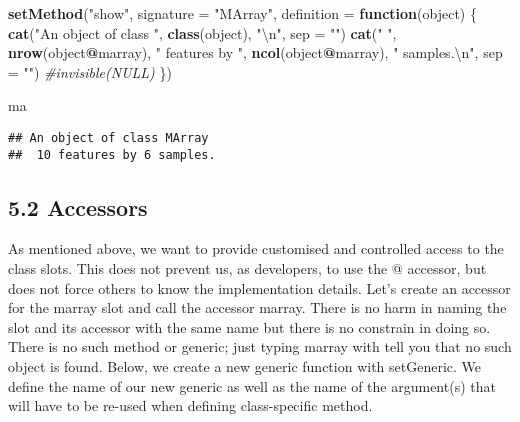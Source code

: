 \documentclass[]{article}
\newenvironment{Shaded}{\begin{snugshade}}{\end{snugshade}}
\newcommand{\CharTok}[1]{\textcolor[rgb]{0.31,0.60,0.02}{#1}}
\newcommand{\CommentTok}[1]{\textcolor[rgb]{0.56,0.35,0.01}{\textit{#1}}}
\newcommand{\ControlFlowTok}[1]{\textcolor[rgb]{0.13,0.29,0.53}{\textbf{#1}}}
\newcommand{\DataTypeTok}[1]{\textcolor[rgb]{0.13,0.29,0.53}{#1}}
\newcommand{\KeywordTok}[1]{\textcolor[rgb]{0.13,0.29,0.53}{\textbf{#1}}}
\newcommand{\NormalTok}[1]{#1}
\newcommand{\OperatorTok}[1]{\textcolor[rgb]{0.81,0.36,0.00}{\textbf{#1}}}
\newcommand{\StringTok}[1]{\textcolor[rgb]{0.31,0.60,0.02}{#1}}
\begin{document}
\begin{Shaded}
\begin{Highlighting}[]
\KeywordTok{setMethod}\NormalTok{(}\StringTok{"show"}\NormalTok{, }
          \DataTypeTok{signature =} \StringTok{"MArray"}\NormalTok{, }
          \DataTypeTok{definition =} \ControlFlowTok{function}\NormalTok{(object) \{}
            \KeywordTok{cat}\NormalTok{(}\StringTok{"An object of class "}\NormalTok{, }\KeywordTok{class}\NormalTok{(object), }\StringTok{"}\CharTok{\textbackslash{}n}\StringTok{"}\NormalTok{, }\DataTypeTok{sep =} \StringTok{""}\NormalTok{)}
            \KeywordTok{cat}\NormalTok{(}\StringTok{" "}\NormalTok{, }\KeywordTok{nrow}\NormalTok{(object}\OperatorTok{@}\NormalTok{marray), }\StringTok{" features by "}\NormalTok{, }\KeywordTok{ncol}\NormalTok{(object}\OperatorTok{@}\NormalTok{marray), }
                \StringTok{" samples.}\CharTok{\textbackslash{}n}\StringTok{"}\NormalTok{, }\DataTypeTok{sep =} \StringTok{""}\NormalTok{)}
            \CommentTok{#invisible(NULL) }
\NormalTok{            \})}
\end{Highlighting}
\end{Shaded}

\begin{Shaded}
\begin{Highlighting}[]
\NormalTok{ma}
\end{Highlighting}
\end{Shaded}

\begin{verbatim}
## An object of class MArray
##  10 features by 6 samples.
\end{verbatim}

\hypertarget{accessors}{%
\subsection{5.2 Accessors}\label{accessors}}

As mentioned above, we want to provide customised and controlled access
to the class slots. This does not prevent us, as developers, to use the
@ accessor, but does not force others to know the implementation
details. Let's create an accessor for the marray slot and call the
accessor marray. There is no harm in naming the slot and its accessor
with the same name but there is no constrain in doing so. There is no
such method or generic; just typing marray with tell you that no such
object is found. Below, we create a new generic function with
setGeneric. We deﬁne the name of our new generic as well as the name of
the argument(s) that will have to be re-used when deﬁning class-speciﬁc
method.
\end{document}
